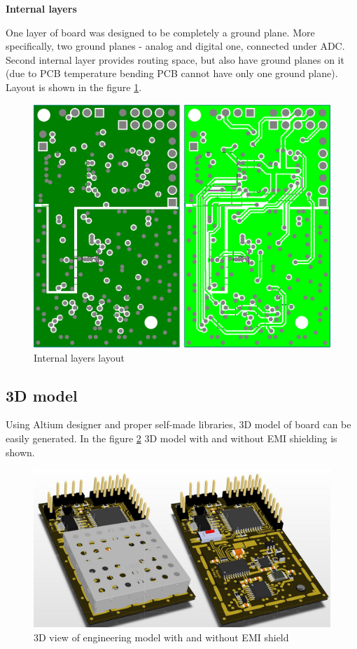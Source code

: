         \bigskip \textbf{Internal layers}

        One layer of board was designed to be completely a ground plane. More specifically, two ground planes - analog and digital one, connected under ADC. Second internal layer provides routing space, but also have ground planes on it (due to PCB temperature bending PCB cannot have only one ground plane). Layout is shown in the figure \ref{internal_layers_layout}.

        \begin{figure}[H]
            \centering
            \includegraphics[width=0.5\paperwidth]{img/06/internal_layers_layout.eps}
            \caption{Internal layers layout}
            \label{internal_layers_layout}
        \end{figure}

    \subsection{3D model}
        Using Altium designer and proper self-made libraries, 3D model of board can be easily generated. In the figure \ref{pcb_3d_model} 3D model with and without EMI shielding is shown.

        \begin{figure}[H]
            \centering
            \includegraphics[width=0.8\paperwidth]{img/06/pcb_3d_model.png}
            \caption{3D view of engineering model with and without EMI shield}
            \label{pcb_3d_model}
        \end{figure}

